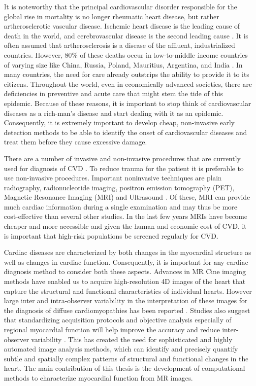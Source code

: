 It is noteworthy that the principal cardiovascular disorder responsible for the global rise in mortality is no longer rheumatic heart disease, but rather artherosclerotic vascular disease. Ischemic heart disease is the leading cause of death in the world, and cerebrovascular disease is the second leading cause \cite{aha}. It is often assumed that artherosclerosis is a disease of the affluent, industrialized countries. However, 80\% of these deaths occur in low-to-middle income countries of varying size like China, Russia, Poland, Mauritius, Argentina, and India \cite{wha}. In many countries, the need for care already outstrips the ability to provide it to its citizens. Throughout the world, even in economically advanced societies, there are deficiencies in preventive and acute care that might stem the tide of this epidemic. Because of these reasons, it is important to stop think of cardiovascular diseases as a rich-man's disease and start dealing with it as an epidemic. Consequently, it is extremely important to develop cheap, non-invasive early detection methods to be able to identify the onset of cardiovascular diseases and treat them before they cause excessive damage. 

There are a number of invasive and non-invasive procedures that are currently used for diagnosis of CVD \cite{merck}. To reduce trauma for the patient it is preferable to use non-invasive procedures. Important noninvasive techniques are plain radiography, radionucleotide imaging, positron emission tomography (PET), Magnetic Resonance Imaging (MRI) and Ultrasound \cite{merck}. Of these, MRI can provide much cardiac information during a single examination and may thus be more cost-effective than several other studies. In the last few years MRIs have become cheaper and more accessible and given the human and economic cost of CVD, it is important that high-risk populations be screened regularly for CVD. 

Cardiac diseases are characterized by both changes in the myocardial structure as well as changes in cardiac function. Consequently, it is important for any cardiac diagnosis method to consider both these aspects. Advances in MR Cine imaging methods have enabled us to acquire high-resolution 4D images of the heart that capture the structural and functional characteristics of individual hearts. However large inter and intra-observer variability in the interpretation of these images for the diagnosis of diffuse cardiomyopathies has been reported \cite{bluemke03}. Studies also suggest that standardizing acquisition protocols and objective analysis especially of regional myocardial function will help improve the accuracy and reduce inter-observer variability \cite{pattynama93}. This has created the need for sophisticated and highly automated image analysis methods, which can identify and precisely quantify subtle and spatially complex patterns of structural and functional changes in the heart. The main contribution of this thesis is the development of computational methods to characterize myocardial function from MR images.

